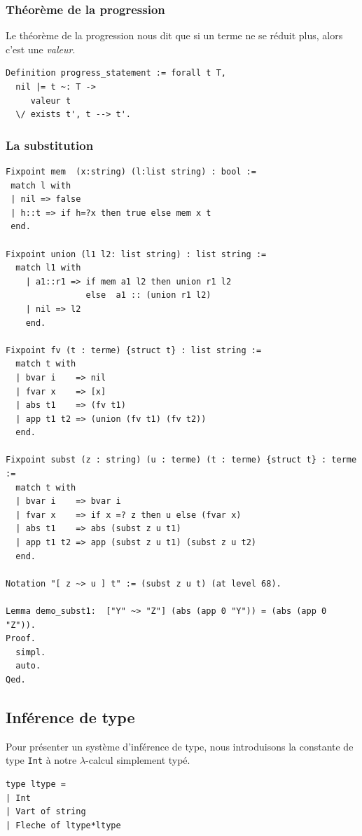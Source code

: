 \subsubsection{Théorème de la progression}
Le théorème de la progression nous dit que si un terme ne se réduit plus, alors c'est une \textit{valeur}.
\begin{Verbatim}
Definition progress_statement := forall t T, 
  nil |= t ~: T ->
     valeur t 
  \/ exists t', t --> t'.
\end{Verbatim}


\subsubsection{La substitution}
\begin{Verbatim}
Fixpoint mem  (x:string) (l:list string) : bool :=
 match l with
 | nil => false
 | h::t => if h=?x then true else mem x t 
 end.

Fixpoint union (l1 l2: list string) : list string :=
  match l1 with
    | a1::r1 => if mem a1 l2 then union r1 l2
                else  a1 :: (union r1 l2)
    | nil => l2
    end.

Fixpoint fv (t : terme) {struct t} : list string :=
  match t with
  | bvar i    => nil
  | fvar x    => [x]
  | abs t1    => (fv t1)
  | app t1 t2 => (union (fv t1) (fv t2))
  end.

Fixpoint subst (z : string) (u : terme) (t : terme) {struct t} : terme :=
  match t with
  | bvar i    => bvar i
  | fvar x    => if x =? z then u else (fvar x)
  | abs t1    => abs (subst z u t1)
  | app t1 t2 => app (subst z u t1) (subst z u t2)
  end.

Notation "[ z ~> u ] t" := (subst z u t) (at level 68).

Lemma demo_subst1:  ["Y" ~> "Z"] (abs (app 0 "Y")) = (abs (app 0 "Z")).
Proof.
  simpl.
  auto.
Qed.
\end{Verbatim}

\subsection{Inférence de type}
Pour présenter un système d'inférence de type, nous introduisons la constante de type \texttt{Int} à notre $\lambda$-calcul
simplement typé.

\begin{Verbatim}
type ltype = 
| Int 
| Vart of string
| Fleche of ltype*ltype
\end{Verbatim}

